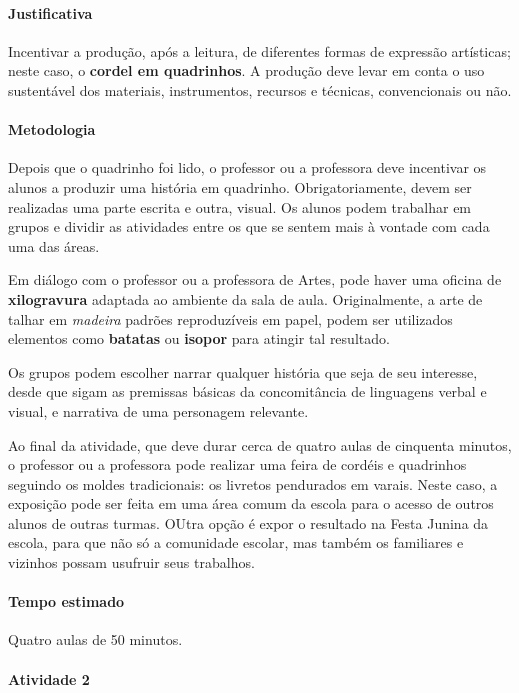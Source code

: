 \documentclass[11pt]{extarticle}
\begin{document}
\paragraph{Justificativa} Incentivar a produção, após a leitura, de diferentes formas de 
expressão artísticas; neste caso, o \textbf{cordel em quadrinhos}. A produção 
deve levar em conta o uso sustentável dos materiais, instrumentos, recursos e técnicas,
convencionais ou não.


\paragraph{Metodologia}

Depois que o quadrinho foi lido, o professor ou a professora deve incentivar os alunos
a produzir uma história em quadrinho. Obrigatoriamente, devem ser realizadas uma parte
escrita e outra, visual. Os alunos podem trabalhar em grupos e dividir as atividades
entre os que se sentem mais à vontade com cada uma das áreas.

Em diálogo com o professor ou a professora de Artes, pode haver uma oficina de \textbf{xilogravura}
adaptada ao ambiente da sala de aula. Originalmente, a arte de talhar em \textit{madeira} padrões
reproduzíveis em papel, podem ser utilizados elementos como \textbf{batatas} ou \textbf{isopor}
para atingir tal resultado. 

Os grupos podem escolher narrar qualquer história que seja de seu interesse,
desde que sigam as premissas básicas da concomitância de linguagens verbal e visual, e 
narrativa de uma personagem relevante. 

Ao final da atividade, que deve durar cerca de quatro aulas de cinquenta minutos,
 o professor ou a professora pode realizar uma feira de cordéis e quadrinhos
 seguindo os moldes tradicionais: os livretos pendurados em varais.
 Neste caso, a exposição pode ser feita em uma área comum da escola para o acesso de outros alunos
 de outras turmas. OUtra opção é expor o resultado na Festa Junina da escola, para que não só a comunidade
 escolar, mas também os familiares e vizinhos possam usufruir seus trabalhos.


\paragraph{Tempo estimado} Quatro aulas de 50 minutos.

\paragraph{Atividade 2}
\end{document}
